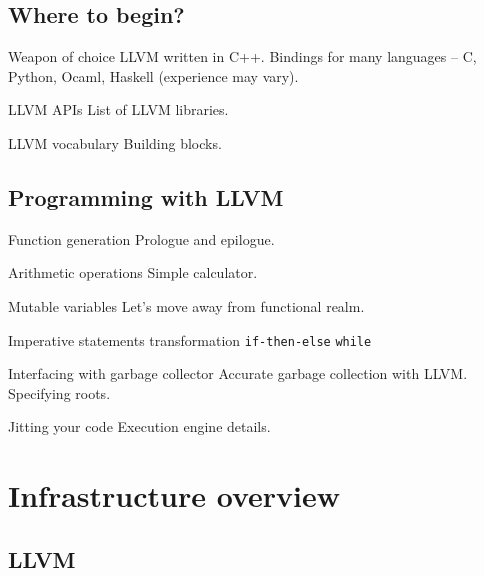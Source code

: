 \documentclass[8pt]{beamer}
\begin{document}
\subsection{Where to begin?}

\begin{frame}{Weapon of choice}
  LLVM written in C++. Bindings for many languages -- C, Python, Ocaml, Haskell
  (experience may vary). 
\end{frame}

\begin{frame}{LLVM APIs}
  List of LLVM libraries.
\end{frame}

\begin{frame}{LLVM vocabulary}
  Building blocks.
\end{frame}

\subsection{Programming with LLVM}

\begin{frame}{Function generation}
  Prologue and epilogue.
\end{frame}

\begin{frame}{Arithmetic operations}
  Simple calculator.
\end{frame}

\begin{frame}{Mutable variables}
  Let's move away from functional realm.
\end{frame}

\begin{frame}[fragile]{Imperative statements transformation}
  \verb+if-then-else+
  \verb+while+
\end{frame}

\begin{frame}{Interfacing with garbage collector}
  Accurate garbage collection with LLVM. Specifying roots.
\end{frame}

\begin{frame}{Jitting your code}
  Execution engine details.
\end{frame}

\section[Infrastructure]{Infrastructure overview}
\subsection{LLVM}
\end{document}
